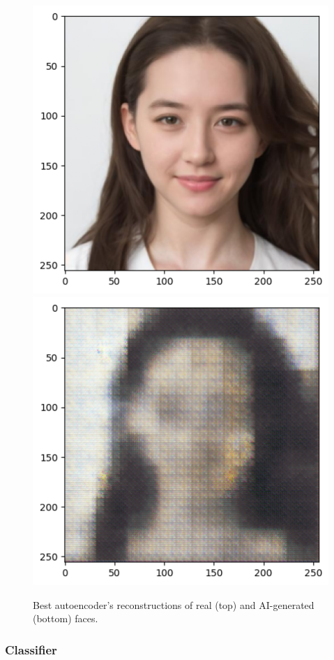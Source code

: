 \documentclass{article} %
\begin{document}
\begin{figure}[h]
\begin{center}
        \includegraphics[scale=0.45]{figs/fake_face_orig.png}
        \includegraphics[scale=0.45]{figs/fake_face_recon.png}
    \end{center}
    \caption{Best autoencoder's reconstructions of real (top) and AI-generated (bottom) faces.}
\end{figure}

\subsubsection{Classifier}
\end{document}
